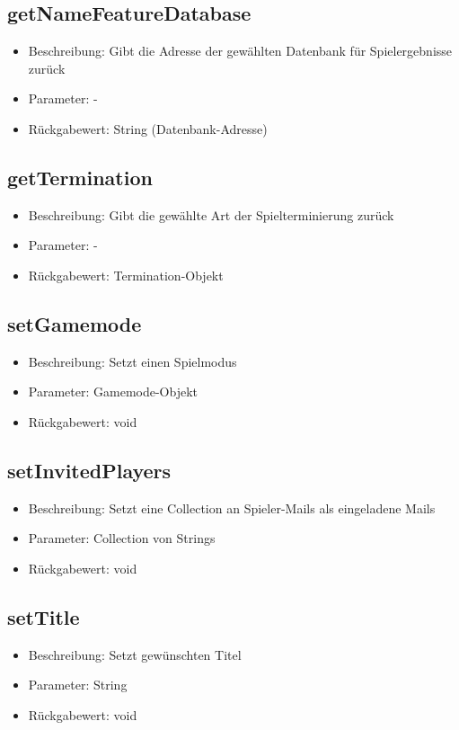 \documentclass[a4paper]{scrreprt}
\begin{document}
	\subsection{getNameFeatureDatabase}
	\begin{itemize}
		\item Beschreibung: Gibt die Adresse der gewählten Datenbank für Spielergebnisse zurück
		\item Parameter: -
		\item Rückgabewert: String (Datenbank-Adresse)
	\end{itemize}
	\subsection{getTermination}
	\begin{itemize}
		\item Beschreibung: Gibt die gewählte Art der Spielterminierung zurück
		\item Parameter: -
		\item Rückgabewert: Termination-Objekt
	\end{itemize}
	\subsection{setGamemode}
	\begin{itemize}
		\item Beschreibung: Setzt einen Spielmodus
		\item Parameter: Gamemode-Objekt
		\item Rückgabewert: void
	\end{itemize}
	\subsection{setInvitedPlayers}
	\begin{itemize}
		\item Beschreibung: Setzt eine Collection an Spieler-Mails als eingeladene Mails
		\item Parameter: Collection von Strings
		\item Rückgabewert: void
	\end{itemize}
	\subsection{setTitle}
	\begin{itemize}
		\item Beschreibung: Setzt gewünschten Titel
		\item Parameter: String
		\item Rückgabewert: void
	\end{itemize}
\end{document}
